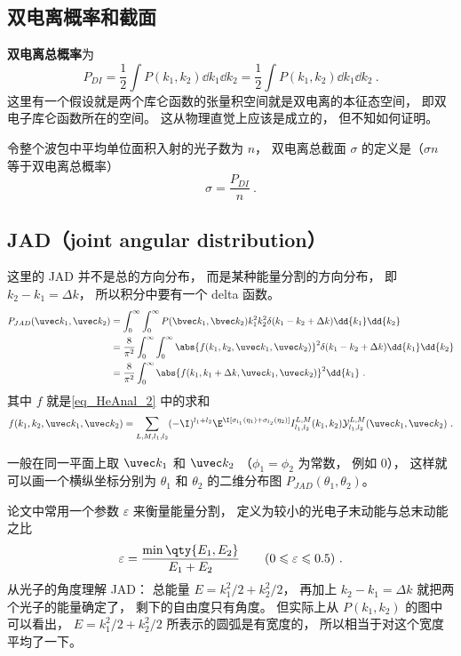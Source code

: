 \subsection{双电离概率和截面}
\textbf{双电离总概率}为
\begin{equation}\label{eq_HeAnal_14}
P_{DI} = \frac{1}{2}\int P(k_1, k_2)\dd{k_1}\dd{k_2} = \frac{1}{2}\int P(k_1, k_2)\dd{k_1}\dd{k_2}~.
\end{equation}
这里有一个假设就是两个库仑函数的张量积空间就是双电离的本征态空间， 即双电子库仑函数所在的空间。 这从物理直觉上应该是成立的， 但不知如何证明。

令整个波包中平均单位面积入射的光子数为 $n$， 双电离总截面 $\sigma$ 的定义是（$\sigma n$ 等于双电离总概率）
\begin{equation}
\sigma = \frac{P_{DI}}{n}~.
\end{equation}

\subsection{JAD（joint angular distribution）}
这里的 JAD 并不是总的方向分布， 而是某种能量分割的方向分布， 即 $k_2 - k_1 = \Delta k$， 所以积分中要有一个 delta 函数。
\begin{equation}\label{eq_HeAnal_22}
\begin{aligned}
P_{JAD}(\uvec k_1, \uvec k_2) &= \int_0^\infty \int_0^\infty P(\bvec k_1, \bvec k_2) k_1^2 k_2^2 \delta(k_1 - k_2 + \Delta k) \dd{k_1} \dd{k_2}\\
&= \frac{8}{\pi^2}\int_0^\infty \int_0^\infty \abs{f(k_1, k_2, \uvec k_1, \uvec k_2)}^2 \delta(k_1 - k_2 + \Delta k) \dd{k_1} \dd{k_2}\\
&= \frac{8}{\pi^2} \int_0^\infty \abs{f(k_1, k_1 + \Delta k, \uvec k_1, \uvec k_2)}^2 \dd{k_1}~.
\end{aligned}
\end{equation}
其中 $f$ 就是\autoref{eq_HeAnal_2} 中的求和
\begin{equation}
f(k_1, k_2, \uvec k_1, \uvec k_2) = \sum_{L, M, l_1, l_2} (-\I)^{l_1 + l_2} \E^{\I [\sigma_{l_1}(\eta_1) + \sigma_{l_2} (\eta_2)]}  I_{l_1, l_2}^{L, M}(k_1, k_2) \mathcal{Y}_{l_1, l_2}^{L, M}(\uvec k_1, \uvec k_2)~.
\end{equation}

一般在同一平面上取 $\uvec k_1$ 和 $\uvec k_2$ （$\phi_1 = \phi_2$ 为常数， 例如 0）， 这样就可以画一个横纵坐标分别为 $\theta_1$ 和 $\theta_2$ 的二维分布图 $P_{JAD}(\theta_1, \theta_2)$。

论文中常用一个参数 $\varepsilon$ 来衡量能量分割， 定义为较小的光电子末动能与总末动能之比
\begin{equation}
\varepsilon = \frac{\min\qty{E_1, E_2}}{E_1 + E_2} \qquad (0 \leqslant \varepsilon \leqslant 0.5)~.
\end{equation}
从光子的角度理解 JAD： 总能量 $E = k_1^2/2 + k_2^2/2$， 再加上 $k_2 - k_1 = \Delta k$ 就把两个光子的能量确定了， 剩下的自由度只有角度。 但实际上从 $P(k_1, k_2)$ 的图中可以看出， $E = k_1^2/2 + k_2^2/2$ 所表示的圆弧是有宽度的， 所以相当于对这个宽度平均了一下。

